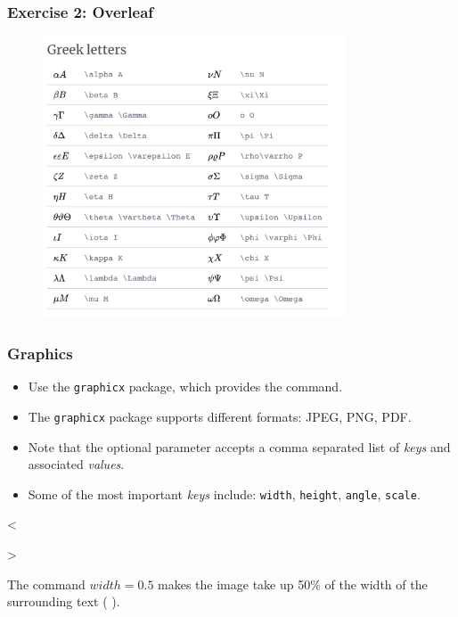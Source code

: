 \begin{frame}[fragile]
\frametitle{Exercise 2: Overleaf}
\begin{figure}
\includegraphics[width=90mm]{figures/Greek.png}
\end{figure}
\end{frame}
\begin{frame}[fragile]
\frametitle{Graphics}
\begin{itemize}
\item Use the  \verb|graphicx| package, which provides the  \color{black} command. \\
\item The \verb|graphicx| package supports different formats: JPEG, PNG, PDF. \\
\item Note that the optional parameter accepts a comma separated list of \textit{keys} and associated \textit{values}.\\
\item Some of the most important \textit{keys} include: \verb|width|, \verb|height|, \verb|angle|, \verb|scale|. \\
\end{itemize}
\begin{framed}
\begin{verbnobox}[\vbdelim]
<>
\end{verbnobox}
\end{framed}
The command $width=0.5$ makes the image take up 50\% of the width of the surrounding text ( \color{blue}{\verb|\textwidth|}\color{black}).
\end{frame}

